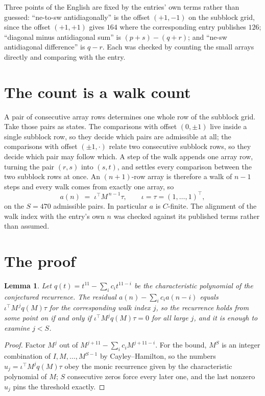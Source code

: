 \documentclass[11pt,a4paper]{article}
\theoremstyle{plain}
\newtheorem{lemma}[theorem]{Lemma}
\theoremstyle{definition}
\begin{document}
Three points of the English are fixed by the entries' own terms rather than guessed:
``ne-to-sw antidiagonally'' is the offset $(+1,-1)$ on the subblock grid, since the offset
$(+1,+1)$ gives $164$ where the corresponding entry publishes $126$; ``diagonal minus
antidiagonal sum'' is $(p+s)-(q+r)$; and ``ne-sw antidiagonal difference'' is $q-r$. Each was
checked by counting the small arrays directly and comparing with the entry.

\section{The count is a walk count}

A pair of consecutive array rows determines one whole row of the subblock grid. Take those
pairs as states. The comparisons with offset $(0,\pm1)$ live inside a single subblock row, so
they decide which pairs are admissible at all; the comparisons with offset $(\pm1,\cdot)$
relate two consecutive subblock rows, so they decide which pair may follow which. A step of the
walk appends one array row, turning the pair $(r,s)$ into $(s,t)$, and settles every comparison
between the two subblock rows at once. An $(n+1)$-row array is therefore a walk of $n-1$ steps
and every walk comes from exactly one array, so
\[
a(n)\;=\;\iota^{\!\top}M^{\,n-1}\tau,\qquad \iota=\tau=(1,\dots,1)^{\!\top},
\]
on the $S=470$ admissible pairs. In particular $a$ is $C$-finite. The alignment of the walk
index with the entry's own $n$ was checked against its published terms rather than assumed.

\section{The proof}

\begin{lemma}\label{lem:crit}
Let $q(t)=t^{11}-\sum_i c_it^{11-i}$ be the characteristic polynomial of the
conjectured recurrence. The residual $a(n)-\sum_ic_ia(n-i)$ equals
$\iota^{\!\top}M^{\,j}q(M)\tau$ for the corresponding walk index $j$, so the recurrence
holds from some point on if and only if $\iota^{\!\top}M^{j}q(M)\tau=0$ for all large $j$,
and it is enough to examine $j<S$.
\end{lemma}

\begin{proof}
Factor $M^{j}$ out of $M^{j+11}-\sum_ic_iM^{j+11-i}$. For the bound, $M^{S}$
is an integer combination of $I,M,\dots,M^{S-1}$ by Cayley--Hamilton, so the numbers
$u_j=\iota^{\!\top}M^{j}q(M)\tau$ obey the monic recurrence given by the characteristic
polynomial of $M$; $S$ consecutive zeros force every later one, and the last nonzero $u_j$
pins the threshold exactly.
\end{proof}
\end{document}
